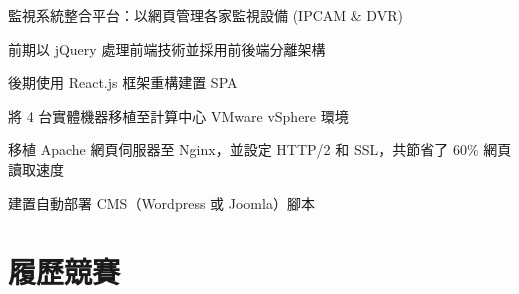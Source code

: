 \documentclass[]{deedy-resume-openfont-ch}
\begin{document}
\begin{minipage}[t]{0.45\textwidth}
\begin{tightemize}
    \item 監視系統整合平台：以網頁管理各家監視設備 (IPCAM \& DVR)
    \item 前期以 jQuery 處理前端技術並採用前後端分離架構
    \item 後期使用 React.js 框架重構建置 SPA
\end{tightemize}

\begin{tightemize}
    \item 將 4 台實體機器移植至計算中心 VMware vSphere 環境
    \item 移植 Apache 網頁伺服器至 Nginx，並設定 HTTP/2 和 SSL，共節省了 60\% 網頁讀取速度
    \item 建置自動部署 CMS（Wordpress 或 Joomla）腳本
\end{tightemize}
\sectionsep


\section{履歷競賽}


\sectionsep

%
%

\end{minipage}
\hfill
\end{document}
